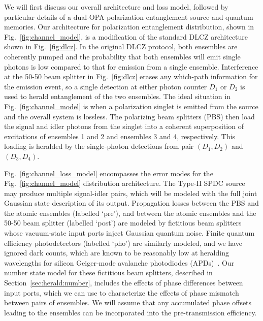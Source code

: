 \documentclass[aps,twocolumn,secnumarabic,amsmath,amssymb,pra,groupedaddress,
showpacs, showkeys,draft]{revtex4-1}
\newcommand{\pna}[1]{\left(#1\right)}
\begin{document}
We will first discuss our overall architecture and loss model, followed by
particular details of a dual-OPA polarization entanglement source and quantum
memories. Our architecture for polarization entanglement distribution, shown in
Fig.~\ref{fig:channel_model}, is a modification of the standard DLCZ
architecture shown in Fig.~\ref{fig:dlcz}. In the original DLCZ protocol, both
ensembles are coherently pumped and the probability that both ensembles will
emit single photons is low compared to that for emission from a single
ensemble. Interference at the 50-50 beam splitter in Fig.~\ref{fig:dlcz} erases
any which-path information for the emission event, so a single detection at
either photon counter $D_1$ or $D_2$ is used to herald entanglement of the two
ensembles. The ideal situation in Fig.~\ref{fig:channel_model} is when a
polarization singlet is emitted from the source and the overall system is
lossless. The polarizing beam splitters (PBS) then load the signal and idler
photons from the singlet into a coherent superposition of excitations of
ensembles 1 and 2 and ensembles 3 and 4, respectively. This loading is heralded
by the single-photon detections from pair $\pna{D_1, D_2}$ and $\pna{D_3,
  D_4}$.

Fig.~\ref{fig:channel_loss_model} encompasses the error modes for the
Fig.~\ref{fig:channel_model} distribution architecture. The Type-II SPDC source
may produce multiple signal-idler pairs, which will be modeled with the full
joint Gaussian state description of its output. Propagation losses between the
PBS and the atomic ensembles (labelled `pre'), and between the atomic ensembles
and the 50-50 beam splitter (labelled `post') are modeled by fictitious beam
splitters whose vacuum-state input ports inject Gaussian quantum noise. Finite
quantum efficiency photodetectors (labelled `pho') are similarly modeled, and
we have ignored dark counts, which are known to be reasonably low at heralding
wavelengths for silicon Geiger-mode avalanche photodiodes
(APDs)~\cite{Thomas2010}. Our number state model for these fictitious beam
splitters, described in Section~\ref{sec:herald:number}, includes the effects
of phase differences between input ports, which we can use to characterize the
effects of phase mismatch between pairs of ensembles. We will assume that any
accumulated phase offsets leading to the ensembles can be incorporated into the
pre-transmission efficiency.
\end{document}
